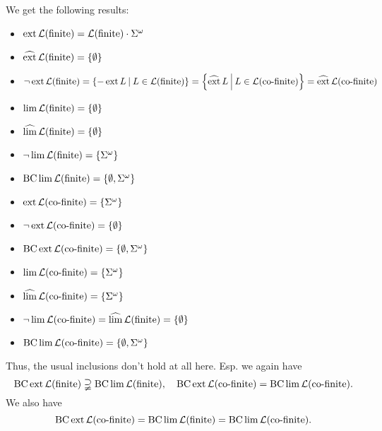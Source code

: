 We get the following results:
\begin{itemize}
\item $\operatorname{ext} \mathcal{L}(\textup{\textrm{finite}}) = \mathcal{L}(\textup{\textrm{finite}}) \cdot \Sigma^\omega$
\item $\dext \Lang(\mathtext{finite}) = \Set{\emptyset}$
\item $\neg\ext \Lang(\mathtext{finite}) = \Set{-\ext L}{L \in \Lang(\mathtext{finite})} = \Set{\dext L}{L \in \Lang(\mathtext{co-finite})} = \dext \Lang(\mathtext{co-finite})$
\item $\lim \Lang(\mathtext{finite}) = \Set{\emptyset}$
\item $\dlim \Lang(\mathtext{finite}) = \Set{\emptyset}$
\item $\neg\lim \Lang(\mathtext{finite}) = \Set{\Sigma^\omega}$
\item $\BC \lim \Lang(\mathtext{finite}) = \Set{\emptyset,\Sigma^\omega}$
\item $\ext \Lang(\mathtext{co-finite}) = \Set{\Sigma^\omega}$
\item $\neg\ext \Lang(\mathtext{co-finite}) = \Set{\emptyset}$
\item $\BC \ext \Lang(\mathtext{co-finite}) = \Set{\emptyset,\Sigma^\omega}$
\item $\lim \Lang(\mathtext{co-finite}) = \Set{\Sigma^\omega}$
\item $\dlim \Lang(\mathtext{co-finite}) = \Set{\Sigma^\omega}$
\item $\neg\lim \Lang(\mathtext{co-finite}) = \dlim \Lang(\mathtext{finite}) = \Set{\emptyset}$
\item $\BC \lim \Lang(\mathtext{co-finite}) = \Set{\emptyset, \Sigma^\omega}$
\end{itemize}

Thus, the usual inclusions don't hold at all here. Esp. we again have
\[ \BC \ext \Lang(\mathtext{finite}) \supsetneqq \BC \lim \Lang(\mathtext{finite}) , \ \ \ 
\BC \ext \Lang(\mathtext{co-finite}) = \BC \lim \Lang(\mathtext{co-finite}) . \]
We also have
\[ \operatorname{BC} \operatorname{ext} \mathcal{L}(\textup{\textrm{co-finite}}) =
\operatorname{BC} \lim \mathcal{L}(\textup{\textrm{finite}}) = \operatorname{BC} \lim \mathcal{L}(\textup{\textrm{co-finite}}) . \]



